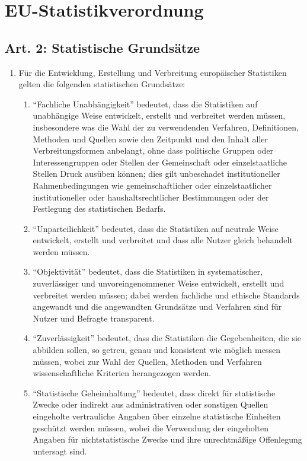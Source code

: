 \chapter[EU-StatV]{EU-Statistikverordnung}
\minitoc
    \section{Art. 2: Statistische Grundsätze}
        \begin{enumerate}
            \item Für die Entwicklung, Erstellung und Verbreitung europäischer Statistiken gelten die folgenden statistischen Grundsätze:
            \begin{enumerate}
                \item ``Fachliche Unabhängigkeit'' bedeutet, dass die Statistiken auf unabhängige Weise entwickelt, erstellt und verbreitet werden müssen, insbesondere was die Wahl der zu verwendenden Verfahren, Definitionen, Methoden und Quellen sowie den Zeitpunkt und den Inhalt aller Verbreitungsformen anbelangt, ohne dass politische Gruppen oder Interessengruppen oder Stellen der Gemeinschaft oder einzelstaatliche Stellen Druck ausüben können; dies gilt unbeschadet institutioneller Rahmenbedingungen wie gemeinschaftlicher oder einzelstaatlicher institutioneller oder haushaltsrechtlicher Bestimmungen oder der Festlegung des statistischen Bedarfs.
                \item ``Unparteilichkeit'' bedeutet, dass die Statistiken auf neutrale Weise entwickelt, erstellt und verbreitet und dass alle Nutzer gleich behandelt werden müssen.
                \item ``Objektivität'' bedeutet, dass die Statistiken in systematischer, zuverlässiger und unvoreingenommener Weise entwickelt, erstellt und verbreitet werden müssen; dabei werden fachliche und ethische Standards angewandt und die angewandten Grundsätze und Verfahren sind für Nutzer und Befragte transparent.
                \item ``Zuverlässigkeit'' bedeutet, dass die Statistiken die Gegebenheiten, die sie abbilden sollen, so getreu, genau und konsistent wie möglich messen müssen, wobei zur Wahl der Quellen, Methoden und Verfahren wissenschaftliche Kriterien herangezogen werden.
                \item ``Statistische Geheimhaltung'' bedeutet, dass direkt für statistische Zwecke oder indirekt aus administrativen oder sonstigen Quellen eingeholte vertrauliche Angaben über einzelne statistische Einheiten geschützt werden müssen, wobei die Verwendung der eingeholten Angaben für nichtstatistische Zwecke und ihre unrechtmäßige Offenlegung untersagt sind.

\end{enumerate}
\end{enumerate}
